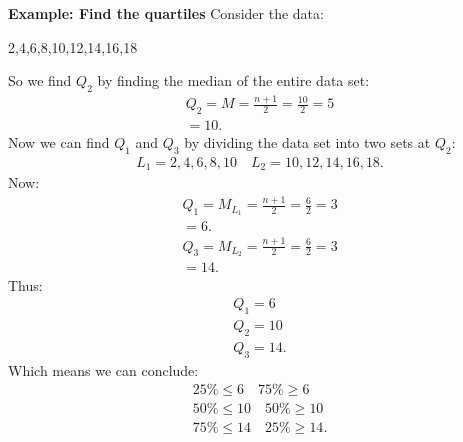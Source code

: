 \documentclass{report}
\begin{document}
         \pagebreak \bigbreak \noindent
         \bigbreak \noindent 
         \begin{mdframed}
           \textbf{Example: Find the quartiles}
           \bigbreak \noindent 
           Consider the data:
           \begin{center}
               2,4,6,8,10,12,14,16,18
           \end{center}
           \bigbreak \noindent 
           So we find $Q_{2}$ by finding the median of the entire data set:
           \begin{align*}
               Q_{2} = M = \frac{n+1}{2} = \frac{10}{2} = 5  \\
               = 10
           .\end{align*}
           \bigbreak \noindent 
           Now we can find $Q_{1}$ and $Q_{3}$ by dividing the data set into two sets at $Q_{2}$:
           \begin{align*}
               L_{1} = 2,4,6,8,10 \quad L_{2} = 10,12,14,16,18
           .\end{align*}
           \bigbreak \noindent 
           Now:
           \begin{align*}
               Q_{1} = M_{L_{1}} = \frac{n+1}{2} = \frac{6}{2} = 3 \\
               =6
           .\end{align*}
           \begin{align*}
               Q_{3} = M_{L_{2}} = \frac{n+1}{2} = \frac{6}{2} =3 \\
               =14
           .\end{align*}
           \bigbreak \noindent 
           Thus:
           \begin{align*}
               Q_{1} = 6 \\
               Q_{2} = 10 \\
               Q_{3} = 14
           .\end{align*}
           \bigbreak \noindent 
           Which means we can conclude:
           \begin{align*}
               25\% \leq 6 \quad 75\% \geq 6 \\
               50\% \leq 10 \quad 50\% \geq 10 \\
               75\% \leq 14 \quad 25\% \geq 14
           .\end{align*}
       \end{mdframed}
\end{document}
